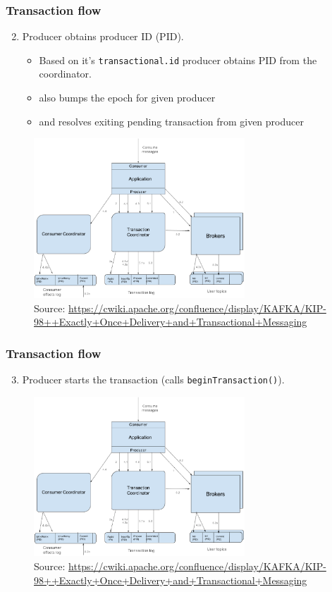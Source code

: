 \documentclass[10pt,utf8]{beamer}
\begin{document}
\begin{frame}
    \frametitle{Transaction flow}
    \begin{enumerate}
        \setcounter{enumi}{1}
        \item Producer obtains producer ID (PID).
        \begin{itemize}
          \item Based on it's \texttt{transactional.id} producer obtains PID from the coordinator.
          \item also bumps the epoch for given producer
          \item and resolves exiting pending transaction from given producer 
        \end{itemize}
    \end{enumerate}
    \begin{figure}
        \centering
        \includegraphics[height=6cm]{./img/tx_flow.eps}
        \caption{\tiny{Source: \url{https://cwiki.apache.org/confluence/display/KAFKA/KIP-98++Exactly+Once+Delivery+and+Transactional+Messaging}}}
    \end{figure}
\end{frame}

\begin{frame}
    \frametitle{Transaction flow}
    \begin{enumerate}
        \setcounter{enumi}{2}
        \item Producer starts the transaction (calls \texttt{beginTransaction()}).
    \end{enumerate}
    \begin{figure}
        \centering
        \includegraphics[height=6cm]{./img/tx_flow.eps}
        \caption{\tiny{Source: \url{https://cwiki.apache.org/confluence/display/KAFKA/KIP-98++Exactly+Once+Delivery+and+Transactional+Messaging}}}
    \end{figure}
\end{frame}
\end{document}
